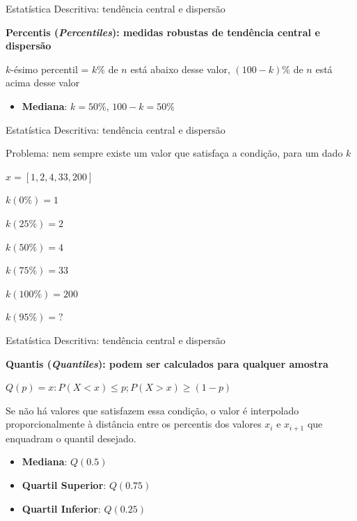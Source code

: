 \documentclass{beamer}\usepackage[]{graphicx}\usepackage[]{color}
\begin{document}
\begin{frame}{Estatística Descritiva: tendência central e dispersão}

\textbf{Percentis (\emph{Percentiles}): medidas robustas de tendência central e dispersão}

$k$-ésimo percentil = $k$\% de $n$ está abaixo desse valor, $(100-k)$\% de $n$ está acima desse valor

\pause

\begin{itemize}
  \item \textbf{Mediana}: $k= 50$\%, $100-k =50$\%
   
\end{itemize}

\end{frame} 


\begin{frame}{Estatística Descritiva: tendência central e dispersão}

\alert{Problema:} nem sempre existe um valor que satisfaça a condição, para um dado $k$

$ x = [1, 2, 4, 33, 200]$

$k(0\%) = 1$

$k(25\%) = 2$

$k(50\%) = 4$

$k(75\%) = 33$

$k(100\%) = 200$

$k(95\%) = ?$

\end{frame} 

\begin{frame}{Estatística Descritiva: tendência central e dispersão}

\textbf{Quantis (\emph{Quantiles}): podem ser calculados para qualquer amostra}

$Q(p) = x:P(X < x) \leq p; P(X > x) \geq (1-p)$

Se não há valores que satisfazem essa condição, o valor é interpolado proporcionalmente à distância entre os percentis dos valores $x_i$ e $x_{i+1}$ que enquadram o quantil desejado.
\pause

\begin{itemize}
  \item \textbf{Mediana}: $Q(0.5)$
  \item \textbf{Quartil Superior}: $Q(0.75)$
  \item \textbf{Quartil Inferior}: $Q(0.25)$
   
\end{itemize}

\end{frame} 
\end{document}
